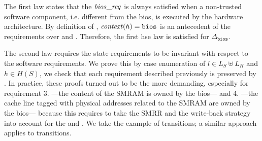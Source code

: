 The first law states that the \( \mathit{bios\_req} \) is always satisfied when a
non-trusted software component, i.e. different from the \ac{bios}, is executed
by the hardware architecture.
%
By definition of , \( \mathit{context}(h) = \mathtt{bios} \) is an
antecedent of the requirements over  and
.
%
Therefore, the first \ac{hse} law is satisfied for \( \Delta_{\mathtt{bios}} \).

The second law requires the state requirements to be invariant with respect to
the software requirements.
%
We prove this by case enumeration of \( l \in L_S \uplus L_H \) and
\( h \in H(S) \), we check that each requirement described previously is
preserved by .
%
In practice, these proofs turned out to be the more demanding, especially for
requirement 3. ---the content of the SMRAM is owned by the \ac{bios}--- and
4. ---the cache line tagged with physical addresses related to the SMRAM are
owned by the \ac{bios}--- because this requires to take the SMRR and the
write-back strategy into account for the  and .
%
We take the example of  transitions; a similar approach applies to
 transitions.


